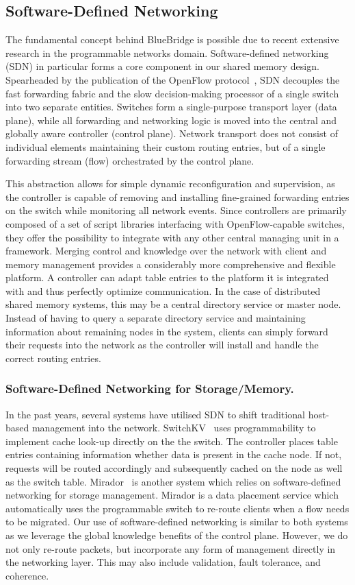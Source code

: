 \subsection{Software-Defined Networking}
The fundamental concept behind BlueBridge is possible due to recent extensive research in the programmable networks domain. Software-defined networking (SDN) in particular forms a core component in our shared memory design. Spearheaded by the publication of the OpenFlow protocol~\cite{openflow}, SDN decouples the fast forwarding fabric and the slow decision-making processor of a single switch into two separate entities. Switches form a single-purpose transport layer (data plane), while all forwarding and networking logic is moved into the central and globally aware controller (control plane). Network transport does not consist of individual elements maintaining their custom routing entries, but of a single forwarding stream (flow) orchestrated by the control plane.

This abstraction allows for simple dynamic reconfiguration and supervision, as the controller is capable of removing and installing fine-grained forwarding entries on the switch while monitoring all network events.
Since controllers are primarily composed of a set of script libraries interfacing with OpenFlow-capable switches, they offer the possibility to integrate with any other central managing unit in a framework. 
Merging control and knowledge over the network with client and memory management provides a considerably more comprehensive and flexible platform. A controller can adapt table entries to the platform it is integrated with and thus perfectly optimize communication.
In the case of distributed shared memory systems, this may be a central directory service or master node. Instead of having to query a separate directory service and maintaining information about remaining nodes in the system, clients can simply forward their requests into the network as the controller will install and handle the correct routing entries.

\subsubsection{Software-Defined Networking for Storage/Memory.}
In the past years, several systems have utilised SDN to shift traditional host-based management into the network. SwitchKV~\cite{switchkv} uses programmability to implement cache look-up directly on the the switch. The controller places table entries containing information whether data is present in the cache node. If not, requests will be routed accordingly and subsequently cached on the node as well as the switch table.
Mirador~\cite{mirador} is another system which relies on software-defined networking for storage management. Mirador is a data placement service which automatically uses the programmable switch to re-route clients when a flow needs to be migrated.
Our use of software-defined networking is similar to both systems as we leverage the global knowledge benefits of the control plane. However, we do not only re-route packets, but incorporate any form of management directly in the networking layer. This may also include validation, fault tolerance, and coherence.

